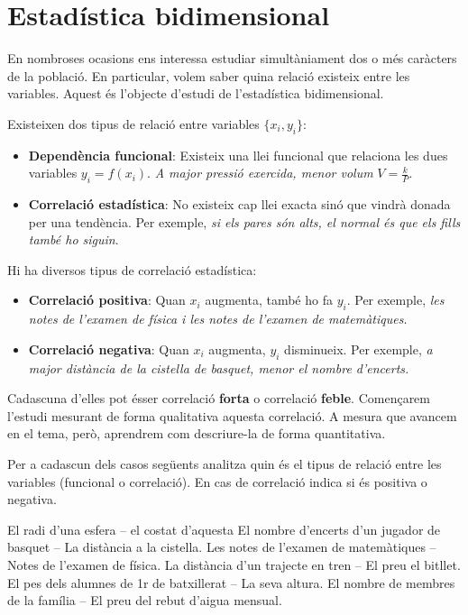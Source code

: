 \section{Estadística bidimensional}
\begin{blueshaded}
	En nombroses ocasions ens interessa estudiar simultàniament dos o més caràcters de la població. En particular, volem saber quina
	  relació  existeix entre les variables. Aquest és l'objecte d'estudi de l'estadística bidimensional.
	
	Existeixen dos tipus de relació entre variables $\{x_i, y_i\}$:
	\begin{itemize}
		\item \textbf{Dependència funcional}: Existeix una llei funcional que relaciona les dues variables \linebreak $y_i  = f(x_i)$. \textit{A major pressió exercida, menor volum} $V=\frac{k}{P}$.
		\item \textbf{Correlació estadística}: No existeix cap llei exacta sinó que vindrà donada per una tendència. Per exemple, \textit{si els pares són alts, el normal és que els fills també ho siguin}.
	\end{itemize}

	Hi ha diversos tipus de correlació estadística:
	\begin{itemize}
		\item \textbf{Correlació positiva}: Quan $x_i$ augmenta, també ho fa $y_i$. Per exemple, \textit{les notes de l'examen de física i les notes de l'examen de matemàtiques.}
		\item \textbf{Correlació negativa}: Quan $x_i$ augmenta, $y_i$ disminueix. Per exemple, \textit{a major distància de la cistella de basquet, menor el nombre d'encerts.}
	\end{itemize}
	Cadascuna d'elles pot ésser correlació \textbf{forta} o correlació \textbf{feble}. Començarem l'estudi mesurant de forma qualitativa aquesta correlació. A mesura que avancem en el tema, però, aprendrem com descriure-la de forma quantitativa.
\end{blueshaded}
 
 \begin{mylist}
 		\exer \mental Per a cadascun dels casos següents analitza quin és el tipus de relació entre les variables (funcional o correlació). En cas de correlació indica si és positiva o negativa.
 	\begin{tasks}
 		\task El radi d'una esfera -- el costat d'aquesta
 		\task El nombre d'encerts d'un jugador de basquet -- La distància a la cistella.
 		\task Les notes de l'examen de matemàtiques -- Notes de l'examen de física.
 		\task La distància d'un trajecte en tren -- El preu el bitllet.
 		\task El pes dels alumnes de 1r de batxillerat -- La seva altura.
 		\task El nombre de membres de la família -- El preu del rebut d'aigua mensual.
 	\end{tasks}
 \end{mylist}
 

